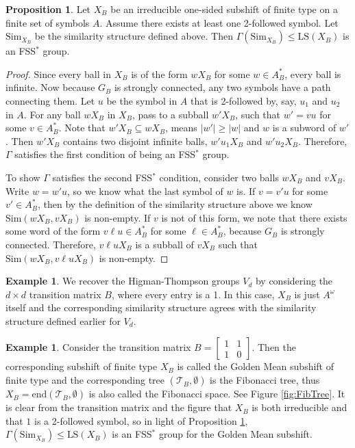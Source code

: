 \documentclass[12pt]{amsart}
\numberwithin{equation}{subsection}
\theoremstyle{definition}
\newtheorem{proposition}[theorem]{Proposition}
\theoremstyle{definition}
\newtheorem{example}[theorem]{Example}
\theoremstyle{remark}
\begin{document}
\begin{proposition}\label{prop:SFTareFSS*}
     Let $X_B$ be an irreducible one-sided subshift of finite type on a finite set of symbols $A$. Assume there exists at least one 2-followed symbol. Let $\text{Sim}_{X_B}$ be the similarity structure defined above. Then $\Gamma(\text{Sim}_{X_B}) \leq \text{LS}(X_B)$ is an FSS$^*$ group. 
\end{proposition}

\begin{proof}
    Since every ball in $X_B$ is of the form $wX_B$ for some $w \in A^*_B$, every ball is infinite. Now because $G_B$ is strongly connected, any two symbols have a path connecting them. Let $u$ be the symbol in $A$ that is 2-followed by, say, $u_1$ and $u_2$ in $A$. For any ball $wX_B$ in $X_B$, pass to a subball $w'X_B$, such that $w'=vu$ for some $v \in A^*_B$. Note that $w'X_B \subseteq wX_B$, means $\vert w' \vert \geq \vert w\vert$ and $w$ is a subword of $w'$. Then $w'X_B$ contains two disjoint infinite balls, $w'u_1X_B$ and $w'u_2X_B$. Therefore, $\Gamma$ satisfies the first condition of being an FSS$^*$ group. 

    To show $\Gamma$ satisfies the second FSS$^*$ condition, consider two balls $wX_B$ and $vX_B$. Write $w=w'u$, so we know what the last symbol of $w$ is. If $v=v'u$ for some $v' \in A^*_B$, then by the definition of the similarity structure above we know $\text{Sim}(wX_B,vX_B)$ is non-empty. If $v$ is not of this form, we note that there exists some word of the form $v\ell u \in A^*_B$ for some $\ell \in A^*_B$, because $G_B$ is strongly connected. Therefore, $v\ell uX_B$ is a subball of $vX_B$ such that $\text{Sim}(wX_B,v\ell uX_B)$ is non-empty. 

\end{proof}



\begin{example}
    We recover the Higman-Thompson groups $V_d$ by considering the $d \times d$ transition matrix $B$, where every entry is a 1. In this case, $X_B$ is just $A^\omega$ itself and the corresponding similarity structure agrees with the similarity structure defined earlier for $V_d$.
\end{example}


\begin{example}\label{ex:fibtree}
    Consider the transition matrix $B = \begin{bmatrix}
        1 & 1 \\
        1 & 0 
    \end{bmatrix}$. 
    Then the corresponding subshift of finite type $X_B$ is called the Golden Mean subshift of finite type and the corresponding tree $(\mathcal T_B,\emptyset)$ is the Fibonacci tree, thus $X_B = \text{end}(\mathcal T_B,\emptyset)$ is also called the Fibonacci space. See Figure \ref{fig:FibTree}. It is clear from the transition matrix and the figure that $X_B$ is both irreducible and that $1$ is a 2-followed symbol, so in light of Proposition \ref{prop:SFTareFSS*}, $\Gamma(\text{Sim}_{X_B}) \leq \text{LS}(X_B)$ is an FSS$^*$ group for the Golden Mean subshift.  
\end{example}
\end{document}
